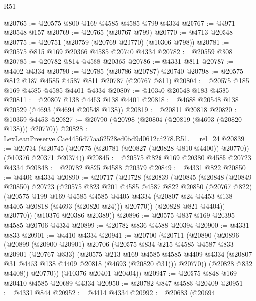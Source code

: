 \begin{lexlean}{R51}
\begin{coremodule}
@20765 := @20575 @800 @169 @4585 @4585 @799 @4334
@20767 := @4971 @20548 @157
@20769 := @20765 (@20767 @799)
@20770 := @4713 @20548
@20775 := @20751 (@20759 (@20769 @20770) (@10306 @798))
@20781 := @20575 @815 @169 @20366 @4585 @20740 @4334
@20782 := @20559 @808
@20785 := @20782 @814 @4588 @20365
@20786 := @4331 @811
@20787 := @4402 @4334
@20790 := @20785 (@20786 @20787) @20740
@20798 := @20575 @812 @187 @4585 @4587 @811 @20787 (@20767 @811)
@20804 := @20575 @185 @169 @4585 @4585 @4401 @4334
@20807 := @10340 @20548 @183 @4585
@20811 := @20807 @138 @4453 @138 @4401
@20818 := @4688 @20548 @138 @20529 (@4693 (@4694 @20548 @138))
@20819 := @20811 @20818
@20820 := @10359 @4453
@20827 := @20790 (@20798 (@20804 (@20819 (@4693 (@20820 @138))) @20770))
@20828 := LexLeanPreserve.Cae4456d77aa62528ed0bd9d0612cd278.R51.__rel_24
@20839 := @20734
    (@20745 (@20775 (@20781 (@20827 (@20828 @810 @4400)) @20770)) (@10376 @20371 @20374))
@20845 := @20575 @826 @169 @20380 @4585 @20723 @4334
@20848 := @20782 @825 @4588 @20379
@20849 := @4331 @822
@20850 := @4406 @4334
@20890 := @20717
    (@20728
      (@20839
        (@20845
          (@20848
            (@20849 @20850)
            @20723
            (@20575
              @823
              @201
              @4585
              @4587
              @822
              @20850
              (@20767 @822)
              (@20575
                @199
                @169
                @4585
                @4585
                @4405
                @4334
                (@20807 @24 @4453 @138 @4405 @20818 (@4693 (@20820 @24)))
                @20770))
            (@20828 @821 @4404))
          @20770))
      (@10376 @20386 @20389))
@20896 := @20575 @837 @169 @20395 @4585 @20706 @4334
@20899 := @20782 @836 @4588 @20394
@20900 := @4331 @833
@20901 := @4410 @4334
@20941 := @20700
    (@20711
      (@20890
        (@20896
          (@20899
            (@20900 @20901)
            @20706
            (@20575
              @834
              @215
              @4585
              @4587
              @833
              @20901
              (@20767 @833)
              (@20575
                @213
                @169
                @4585
                @4585
                @4409
                @4334
                (@20807 @31 @4453 @138 @4409 @20818 (@4693 (@20820 @31)))
                @20770))
            (@20828 @832 @4408))
          @20770))
      (@10376 @20401 @20404))
@20947 := @20575 @848 @169 @20410 @4585 @20689 @4334
@20950 := @20782 @847 @4588 @20409
@20951 := @4331 @844
@20952 := @4414 @4334
@20992 := @20683
    (@20694

\end{coremodule}
\end{lexlean}
